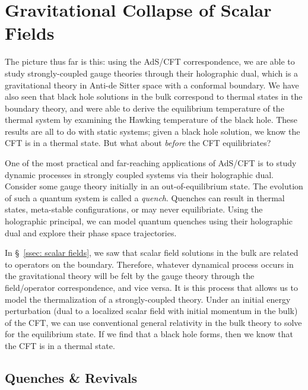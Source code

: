 \documentclass[../PhD.tex]{subfiles}
\begin{document}

\section{Gravitational Collapse of Scalar Fields}
\label{sec: grav collapse}

The picture thus far is this: using the AdS/CFT correspondence, we are able to study strongly-coupled gauge theories through their holographic dual, which is a gravitational theory in Anti-de Sitter space with a conformal boundary. We have also seen that black hole solutions in the bulk correspond to thermal states in the boundary theory, and were able to derive the equilibrium temperature of the thermal system by examining the Hawking temperature of the black hole. These results are all to do with static systems; given a black hole solution, we know the CFT is in a thermal state. But what about \emph{before} the CFT equilibriates? 

One of the most practical and far-reaching applications of AdS/CFT is to study dynamic processes in strongly coupled systems via their holographic dual. Consider some gauge theory initially in an out-of-equilibrium state. The evolution of such a quantum system is called a \emph{quench}. Quenches can result in thermal states, meta-stable configurations, or may never equilibriate. Using the holographic principal, we can model quantum quenches using their holographic dual and explore their phase space trajectories.

In \S~\!\ref{ssec: scalar fields}, we saw that scalar field solutions in the bulk are related to operators on the boundary. Therefore, whatever dynamical process occurs in the gravitational theory will be felt by the gauge theory through the field/operator correspondence, and vice versa. It is this process that allows us to model the thermalization of a strongly-coupled theory. Under an initial energy perturbation (dual to a localized scalar field with initial momentum in the bulk) of the CFT, we can use conventional general relativity in the bulk theory to solve for the equilibrium state. If we find that a black hole forms, then we know that the CFT is in a thermal state.


\subsection{Quenches \& Revivals}
\label{sub: quenches}
\end{document}
